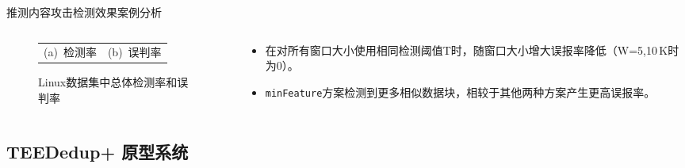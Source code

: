 \documentclass{beamer}
\newcommand{\prototype}{TEEDedup+ }
\begin{document}
\begin{frame}{推测内容攻击检测效果案例分析}
\begin{columns}
\begin{column}{.6\textwidth}
\begin{figure}[!htb]
\begin{tabular}{@{\ }c@{\ }c}
                    \mbox{\small (a) 检测率}                                                                                &
                    \mbox{\small (b) 误判率}                                                                                  \\
                \end{tabular}
                \caption{Linux数据集中总体检测率和误判率}
                \label{fig:featurespy-expDetectionOverallFalsePositive}
            \end{figure}
        \end{column}
        \begin{column}{.4\textwidth}
            \begin{itemize}
                \item 在对所有窗口大小使用相同检测阈值T时，随窗口大小增大误报率降低（W=5,10\,K时为0）。
                \item {\tt minFeature}方案检测到更多相似数据块，相较于其他两种方案产生更高误报率。
            \end{itemize}
        \end{column}
    \end{columns}
\end{frame}

\subsection{\prototype 原型系统}
\end{document}
